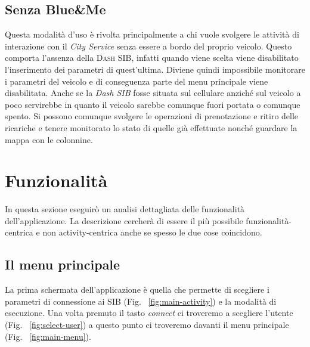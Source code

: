 \subsection{Senza Blue\&{}Me}\label{subsec:noblueme}

Questa modalità d'uso è rivolta principalmente a chi vuole svolgere le attività di interazione con il \emph{City Service} senza essere a bordo del proprio veicolo. Questo comporta l'assenza della \textsc{Dash SIB}, infatti quando viene scelta viene disabilitato l'inserimento dei parametri di quest'ultima. Diviene quindi impossibile monitorare i parametri del veicolo e di conseguenza parte del menu principale viene disabilitata. Anche se la \emph{Dash SIB} fosse situata sul cellulare anziché sul veicolo a poco servirebbe in quanto il veicolo sarebbe comunque fuori portata o comunque spento. Si possono comunque svolgere le operazioni di prenotazione e ritiro delle ricariche e tenere monitorato lo stato di quelle già effettuate nonché guardare la mappa con le colonnine.


\section{Funzionalità}

In questa sezione eseguirò un analisi dettagliata delle funzionalità dell'applicazione. La descrizione cercherà di essere il più possibile funzionalità-centrica e non activity-centrica anche se spesso le due cose coincidono. 


\subsection{Il menu principale}

La prima schermata dell'applicazione è quella che permette di scegliere i parametri di connessione ai SIB (Fig. ~\ref{fig:main-activity})  e la modalità di esecuzione. Una volta premuto il tasto \emph{connect} ci troveremo a scegliere l'utente (Fig. ~\ref{fig:select-user}) a questo punto ci troveremo davanti il menu principale (Fig. ~\ref{fig:main-menu}).

